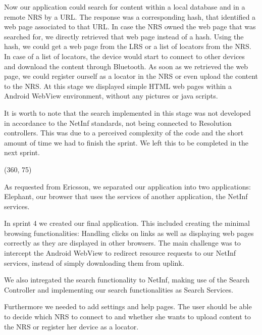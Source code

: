 Now our application could search for content within a local database and in a remote
NRS by a URL. The response was a corresponding hash, that identified a
web page associated to that URL. In case the NRS owned the web page that
was searched for, we directly retrieved that web page instead of a hash. Using the hash, we could get a web page from the LRS or a list of locators
from the NRS. In case of a list of locators, the device would start to
connect to other devices and download the content through Bluetooth.
As soon as we retrieved the web page, we could register ourself as a 
locator in the NRS or even upload the content to the NRS.
At this stage we displayed simple HTML web pages within a Android WebView environment, without any pictures or
java scripts.

It is worth to note that the search implemented in this stage was not developed in accordance to the NetInf
standards, not being connected to Resolution controllers. This was due to a perceived complexity of the code
and the short amount of time we had to finish the sprint. We left this to be completed in the next sprint.

\framebox(360, 75){
}

As requested from Ericsson, we separated our application into two
applications: Elephant, our browser that uses the services of another application,
the NetInf services. 

In sprint 4 we created our final application. This included
creating the minimal browsing functionalities: Handling clicks on links
as well as displaying web pages correctly as they are displayed in
other browsers. The main challenge was to intercept the Android WebView
to redirect resource requests to our NetInf services, instead of simply
downloading them from uplink.

We also intregated the search functionality to NetInf, making use of the Search Controller and
implementing our search functionalities as Search Services.

Furthermore we needed to add settings and help pages. The user should
be able to decide which NRS to connect to and whether she wants to upload content to the NRS or
register her device as a locator.

